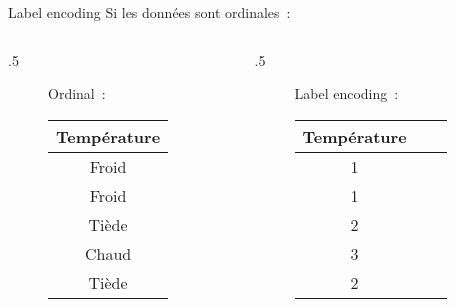 \begin{frame}{Label encoding}
  Si les données sont ordinales :
  \begin{columns}
    \begin{column}{.5\tw}
      \begin{figure}
        \centering
        Ordinal :\\[.5cm]
        \begin{tabular}{c}
          \toprule
          Température \\
          \midrule
          Froid \\
          Froid \\
          Tiède \\
          Chaud \\
          Tiède \\
          \bottomrule
        \end{tabular}
      \end{figure}
    \end{column}
    \begin{column}{.5\tw}
      \begin{figure}
        \centering
        Label encoding :\\[.5cm]
        \begin{tabular}{ccc}
          \toprule
          Température \\
          \midrule
          1 \\
          1 \\
          2 \\
          3 \\
          2 \\
          \bottomrule
        \end{tabular}
      \end{figure}
    \end{column}
  \end{columns}
\end{frame}


